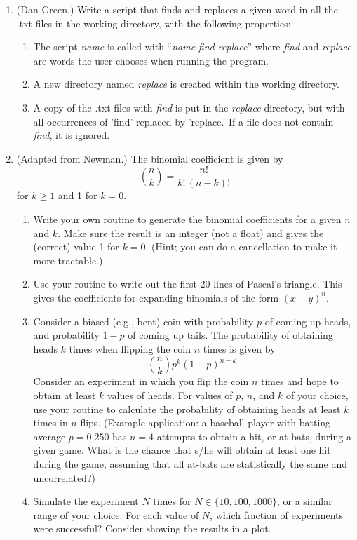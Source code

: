 \documentclass[]{article}
\begin{document}
\begin{enumerate} \item (Dan Green.) Write a script that finds and replaces a given word in all the .txt files in the working directory, with the following properties:
  \begin{enumerate}[a]
  \item The script {\it name} is called with ``{\it name} {\it find replace}'' where {\it find} and {\it replace} are words the user  chooses when running the program.
  \item A new directory named {\it replace} is created  within the working directory.
  \item A copy of the .txt files with {\it find}  is put in the {\it replace} directory, but with all occurrences of 'find' replaced by 'replace.'  If a file does not contain {\it find}, it is ignored.
  \end{enumerate}
  


\item (Adapted from Newman.) The binomial coefficient is given by 
  \begin{equation}
    {n \choose k} = \frac{n!}{k!\,(n-k)!}
  \end{equation} for $k \ge 1$ and 1 for $k = 0$.
  
  \begin{enumerate}[a]
  \item Write your own routine to generate the binomial coefficients for a given $n$ and $k$.  Make sure the result is an integer (not a float) and gives the (correct) value 1 for $k=0$. (Hint; you can do a cancellation to make it more tractable.)
  \item Use your routine to write out the first 20 lines of Pascal's triangle.  This gives the coefficients for expanding binomials of the form $(x + y)^n$.
  \item Consider a biased (e.g., bent) coin with probability $p$ of coming up heads, and probability $1-p$ of coming up tails.  The probability of obtaining heads $k$ times when flipping the coin $n$ times is given by 
    \begin{equation}
      {n  \choose k}  p^k(1-p)^{n-k}.
    \end{equation}
    Consider an experiment in which you flip the coin $n$ times and hope to obtain at least $k$ values of heads.  For values of $p$, $n$, and $k$ of your choice, use your routine to calculate the probability of obtaining heads at least $k$ times in $n$ flips.  (Example application: a baseball player with batting average $p = 0.250$ has $n = 4$ attempts to obtain a hit, or at-bats, during a given game. What is the chance that s/he will obtain at least one hit during the game, assuming that all at-bats are statistically the same and uncorrelated?)  
  \item Simulate the experiment $N$ times for $N \in \{10, 100, 1000 \}$,   or a similar range of your choice.  For each value of $N$, which fraction of experiments were successful?  Consider showing the results in a plot.
  \end{enumerate}
  

\end{enumerate}
\end{document}

